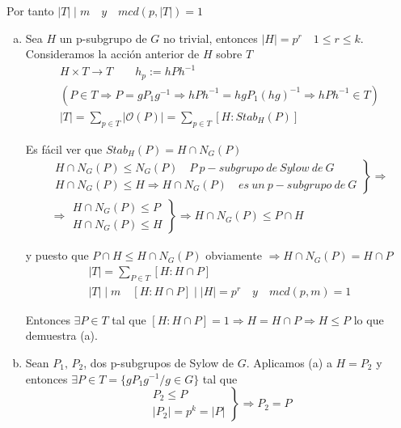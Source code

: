 \documentclass{article}
\begin{document}
Por tanto $|T|\mid m\quad y\quad mcd(p,|T|)=1$
\begin{enumerate}[(a)]
\item Sea $H$ un p-subgrupo de $G$ no trivial, entonces $|H|=p^r\quad 1\leq r\leq k$. Consideramos la acción anterior de $H$ sobre $T$
\begin{gather*}
H\times T\longrightarrow T\qquad h_p:=hPh^{-1} \\
(P\in T\Rightarrow P=gP_1g^{-1}\Rightarrow hPh^{-1}=hgP_1(hg)^{-1}\Rightarrow hPh^{-1}\in T) \\
|T|=\sum_{p\in T}|\mathcal{O}(P)|=\sum_{p\in T}\left[H:Stab_H(P)\right]
\end{gather*}

Es fácil ver que $Stab_H(P)=H\cap N_G(P)$
\begin{gather*}
\left.\begin{array}{c}
H\cap N_G(P)\leq N_G(P)\quad P\:p-subgrupo\:de\:Sylow\:de\:G \\
H\cap N_G(P)\leq H\Rightarrow H\cap N_G(P)\quad es\:un\:p-subgrupo\:de\:G
\end{array}\right\rbrace\Rightarrow\\
\Rightarrow\left.\begin{array}{c}
H\cap N_G(P)\leq P\\
H\cap N_G(P)\leq H
\end{array}\right\rbrace \Rightarrow H\cap N_G(P)\leq P\cap H
\end{gather*}

y puesto que $P\cap H\leq H\cap N_G(P)$ obviamente $\Rightarrow H\cap N_G(P)=H\cap P$
\begin{gather*}
|T|=\sum_{P\in T}\left[H:H\cap P\right] \\
|T|\mid m\quad \left[H:H\cap P\right]\mid |H|=p^r\quad y\quad mcd(p,m)=1
\end{gather*}

Entonces $\exists P\in T$ tal que $\left[H:H\cap P\right]=1\Rightarrow H=H\cap P\Rightarrow H\leq P$ lo que demuestra (a).

\item Sean $P_1,\,P_2$, dos p-subgrupos de Sylow de $G$. Aplicamos (a) a $H=P_2$ y entonces $\exists P\in T=\{gP_1g^{-1}/g\in G\}$ tal que
\begin{equation*}
\left.\begin{array}{c}
P_2\leq P\\
|P_2|=p^k=|P|
\end{array}\right\rbrace \Rightarrow P_2=P
\end{equation*}


\end{enumerate}
\end{document}
